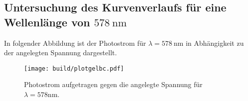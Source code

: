 \subsection{Untersuchung des Kurvenverlaufs für eine Wellenlänge von $\SI{578}{\nano\meter}$}
In folgender Abbildung ist der Photostrom für $\lambda = \SI{578}{\nano\meter}$ in
Abhängigkeit zu der angelegten Spannung dargestellt.
\begin{figure}[H]
  \centering
  \texttt{[image: build/plotgelbc.pdf]}
  \label{fig:plotgelbc}
  \caption{Photostrom aufgetragen gegen die angelegte Spannung für $\lambda = 578 \si{\nano\meter}$.}
\end{figure}
\noindent
